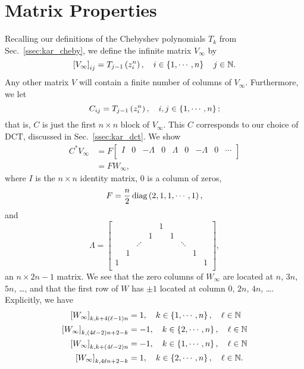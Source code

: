 \section{\CV{} Matrix Properties}
\label{sec:CV_mat}

Recalling our definitions of the Chebyshev polynomials $T_{k}$
from Sec.~\ref{ssec:kar_cheby},
we define the infinite \CV{} matrix $V_{\infty}$ by
%
\begin{equation}
    \left[ V_{\infty} \right]_{ij}
        = T_{j-1}\left( z_{i}^{n} \right),\quad i\in\left\{ 1,\cdots,n \right\}
    \quad j\in\mathbb{N}.
\end{equation}
%
Any other \CV{} matrix $V$ will contain
a finite number of columns of $V_{\infty}$.
Furthermore, we let
%
\begin{equation}
\label{eq:C_def}
    C_{ij} = T_{j-1}\left( z_{i}^{n} \right),\quad i,j\in\left\{ 1,\cdots,n \right\};
\end{equation}
%
that is, $C$ is just the first $n\times n$ block of $V_{\infty}$.
This $C$ corresponds to our choice of DCT, discussed in Sec.~\ref{ssec:kar_dct}.
We show
%
\begin{align}
    C^{*}V_{\infty} &= F\begin{bmatrix}
    I & 0 & -\Lambda & 0 & \Lambda & 0 & -\Lambda & 0 & \cdots \\
    \end{bmatrix} \nonumber\\
     &= FW_{\infty},
\end{align}
%
where $I$ is the $n\times n$ identity matrix, $0$ is a column of zeros,
%
\begin{equation}
    F = \frac{n}{2}\operatorname{diag}\left( 2, 1, 1, \cdots, 1 \right),
\end{equation}
%
and
%
\begin{equation}
    \Lambda = \begin{bmatrix}
    & & & & 1 & & & & \\
    & & & 1 & & 1 & & & \\
    & & \iddots & & & & \ddots & & \\
    & 1 & & & & & & 1 & \\
    1 & & & & & & & & 1 \\
    \end{bmatrix},
\end{equation}
%
an $n\times 2n-1$ matrix. We see that the zero columns of $W_{\infty}$
are located at $n$, $3n$, $5n$, \dots, and that the
first row of $W$ has $\pm1$ located at column $0$, $2n$, $4n$, \dots.
Explicitly, we have
%
\begin{align}
    \left[ W_{\infty} \right]_{k,k+4(\ell-1)n} &= 1,
        \quad k\in\left\{ 1,\cdots,n \right\}, \quad \ell\in\mathbb{N} \nonumber\\
    \left[ W_{\infty} \right]_{k,(4\ell-2)n+2-k} &= -1,
        \quad k\in\left\{ 2,\cdots,n \right\}, \quad \ell\in\mathbb{N} \nonumber\\
    \left[ W_{\infty} \right]_{k,k+(4\ell-2)n} &= -1,\quad k\in\left\{ 1,\cdots,n \right\},
        \quad \ell\in\mathbb{N} \nonumber\\
    \left[ W_{\infty} \right]_{k,4\ell n+2-k} &= 1,
        \quad k\in\left\{ 2,\cdots,n \right\}, \quad \ell\in\mathbb{N}.
\end{align}

